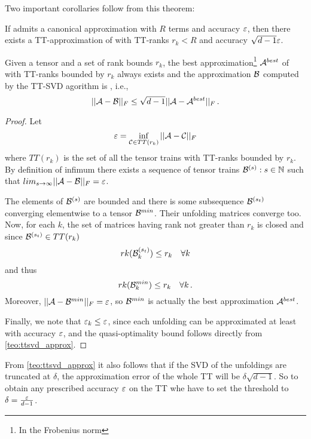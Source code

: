 Two important corollaries follow from this theorem:
\begin{Cor}
  If \A admits a canonical approximation with $R$ terms and accuracy $\varepsilon$, then there exists a TT-approximation of \A with TT-ranks $r_k < R$ and accuracy $\sqrt{d-1} \varepsilon$.
\end{Cor}
\begin{Cor}
  Given a tensor \A and a set of rank bounds $r_k$, the best approximation\footnote{In the Frobenius norm} $\mathcal{A}^{best}$ of \A with TT-ranks bounded by $r_k$ always exists and the approximation $\mathcal{B}$ computed by the TT-SVD agorithm is , i.e.,
  \begin{equation*}
    ||\mathcal{A} - \mathcal{B}||_F \le \sqrt{d-1} ||\mathcal{A} - \mathcal{A}^{best}||_F\, .
  \end{equation*}

  \begin{proof}
    Let
    \begin{equation*}
     \varepsilon = \inf_{\mathcal{C} \in TT(r_k)} ||\mathcal{A} - \mathcal{C}||_F
    \end{equation*}
    where $TT(r_k)$ is the set of all the tensor trains with TT-ranks bounded by $r_k$. By definition of infimum there exists a sequence of tensor trains $\mathcal{B}^{(s)} : s \in \mathbb{N}$ such that $lim_{s\to\infty} ||\mathcal{A} - \mathcal{B}||_F = \varepsilon$.

    The elements of $\mathcal{B}^{(s)}$ are bounded and there is some subsequence $\mathcal{B}^{(s_t)}$ converging elementwise to a tensor $\mathcal{B}^{min}$. Their unfolding matrices converge too. Now, for each $k$, the set of matrices having rank not greater than $r_k$ is closed and since $\mathcal{B}^{(s_t)} \in TT(r_k)$
    \begin{equation*}
      rk(\mathcal{B}^{(s_t)}_k) \le r_k \quad \forall k
    \end{equation*}
    and thus
    \begin{equation*}
      rk(\mathcal{B}^{min}_k) \le r_k \quad \forall k\, .
    \end{equation*}
    Moreover, $||\mathcal{A} - \mathcal{B}^{min}||_F = \varepsilon$, so $\mathcal{B}^{min}$ is actually the best approximation $\mathcal{A}^{best}$.

    Finally, we note that $\varepsilon_k \le \varepsilon$, since each unfolding can be approximated at least with accuracy $\varepsilon$, and the quasi-optimality bound follows directly from \ref{teo:ttsvd_approx}.
  \end{proof}
\end{Cor}

\begin{Cor} \label{cor:tt_tsvd_error}
  From \eqref{teo:ttsvd_approx} it also follows that if the SVD of the unfoldings are truncated at $\delta$, the approximation error of the whole TT will be $\delta \sqrt{d-1}$. So to obtain any prescribed accuracy $\varepsilon$ on the TT whe have to set the threshold to $\delta = \frac{\varepsilon}{d-1}$.
\end{Cor}

